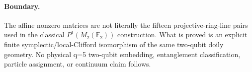 \paragraph{Boundary.}
The affine nonzero matrices are not literally the fifteen projective-ring-line
pairs used in the classical $P^1(M_2(\mathbb F_2))$ construction.  What is
proved is an explicit finite symplectic/local-Clifford isomorphism of the same
two-qubit doily geometry.  No physical q=5 two-qubit embedding, entanglement
classification, particle assignment, or continuum claim follows.
